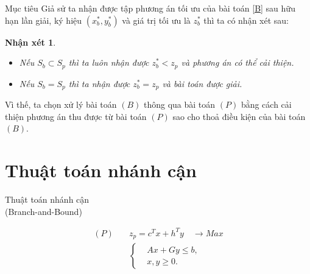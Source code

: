 \documentclass{beamer}
\newtheorem{nx}{Nhận xét}[section]
\begin{document}
\begin{frame}{Mục tiêu} %
Giả sử ta nhận được tập phương án tối ưu của bài toán \eqref{B} sau hữu hạn lần giải, ký hiệu $(x_b^*, y_b^*)$ và giá trị tối ưu là $z_b^*$ thì ta có nhận xét sau:
\begin{nx}
\begin{itemize}
\item Nếu $S_b \subset S_p$ thì ta luôn nhận được $z_b^* < z_p$ và phương án có thể cải thiện.
\item Nếu $S_b = S_p$ thì ta nhận được $z_b^* = z_p$ và bài toán được giải.
\end{itemize}    
\end{nx}
Vì thế, ta chọn xử lý bài toán $(B)$ thông qua bài toán $(P)$ bằng cách cải thiện phương án thu được từ bài toán $(P)$ sao cho thoả điều kiện của bài toán $(B)$.
\end{frame}

\section{Thuật toán nhánh cận}
\begin{frame}
   \center
   \huge Thuật toán nhánh cận \\ (Branch-and-Bound)
\end{frame}

\begin{frame}
    \begin{equation}
    \begin{split}
        (P) \quad & z_p=c^Tx+h^Ty \quad \longrightarrow Max \\
                & \left\{\begin{split}
                    &Ax+Gy \leq  b, \\
                    &x,y \geq 0.
                \end{split}\right.    
    \end{split}
    \end{equation}

\end{frame}

\begin{frame}
\end{frame}
\end{document}
